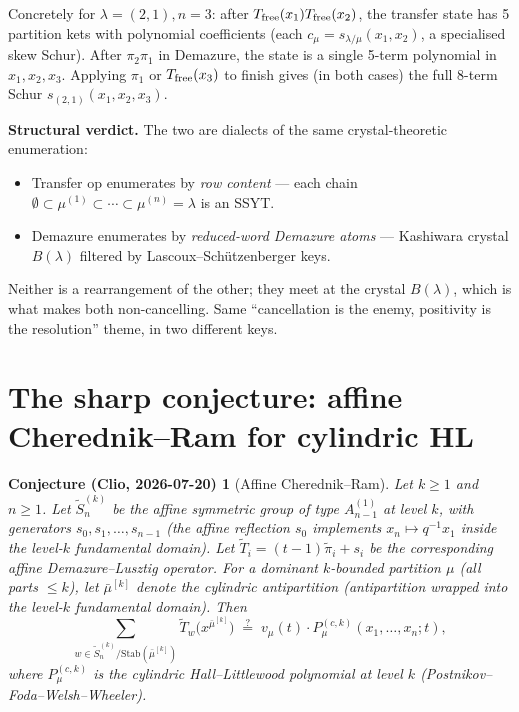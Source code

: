 \documentclass[11pt]{article}
\newtheorem*{conjecture*}{Conjecture (Clio, 2026-07-20)}
\begin{document}
Concretely for $\lambda = (2, 1), n = 3$: after $T_{\rm free}(x_1)
T_{\rm free}(x_2)$, the transfer state has 5 partition kets with polynomial
coefficients (each $c_\mu = s_{\lambda/\mu}(x_1, x_2)$, a specialised skew
Schur). After $\pi_2 \pi_1$ in Demazure, the state is a single 5-term
polynomial in $x_1, x_2, x_3$. Applying $\pi_1$ or $T_{\rm free}(x_3)$ to
finish gives (in both cases) the full 8-term Schur $s_{(2,1)}(x_1, x_2, x_3)$.

\textbf{Structural verdict.} The two are dialects of the same crystal-theoretic
enumeration:
\begin{itemize}
\item Transfer op enumerates by \emph{row content} --- each chain
    $\emptyset \subset \mu^{(1)} \subset \cdots \subset \mu^{(n)} = \lambda$
    is an SSYT.
\item Demazure enumerates by \emph{reduced-word Demazure atoms} --- Kashiwara
    crystal $B(\lambda)$ filtered by Lascoux--Schützenberger keys.
\end{itemize}
Neither is a rearrangement of the other; they meet at the crystal
$B(\lambda)$, which is what makes both non-cancelling. Same
``cancellation is the enemy, positivity is the resolution'' theme, in two
different keys.

\section{The sharp conjecture: affine Cherednik--Ram for cylindric HL}

\begin{conjecture*}[Affine Cherednik--Ram]
Let $k \geq 1$ and $n \geq 1$. Let $\widetilde{S}_n^{(k)}$ be the affine
symmetric group of type $A_{n-1}^{(1)}$ at level $k$, with generators $s_0,
s_1, \ldots, s_{n-1}$ (the affine reflection $s_0$ implements
$x_n \mapsto q^{-1} x_1$ inside the level-$k$ fundamental domain).
Let $\widetilde{T}_i = (t-1)\widetilde{\pi}_i + s_i$ be the corresponding
affine Demazure--Lusztig operator. For a dominant $k$-bounded partition $\mu$
(all parts $\leq k$), let $\bar\mu^{[k]}$ denote the cylindric
antipartition (antipartition wrapped into the level-$k$ fundamental domain).
Then
\[
\sum_{w \in \widetilde{S}_n^{(k)} / \mathrm{Stab}(\bar\mu^{[k]})}
    \widetilde{T}_w\bigl(x^{\bar\mu^{[k]}}\bigr)
\;\stackrel{?}{=}\;
v_\mu(t) \cdot P^{(c, k)}_\mu(x_1, \ldots, x_n; t),
\]
where $P^{(c, k)}_\mu$ is the cylindric Hall--Littlewood polynomial at level
$k$ (Postnikov--Foda--Welsh--Wheeler).
\end{conjecture*}
\end{document}
